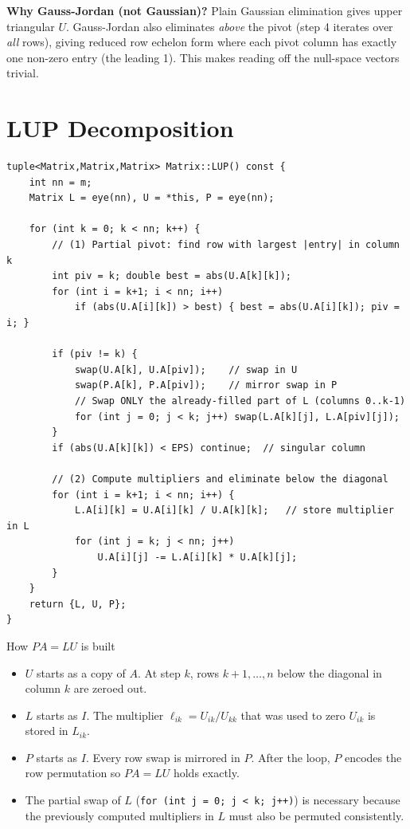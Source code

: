 \documentclass[12pt, a4paper]{article}
\newcommand{\code}[1]{\texttt{\small#1}}
\begin{document}
\noindent
\textbf{Why Gauss-Jordan (not Gaussian)?}  Plain Gaussian elimination gives
upper triangular $U$.  Gauss-Jordan also eliminates \emph{above} the pivot
(step 4 iterates over \emph{all} rows), giving reduced row echelon form where
each pivot column has exactly one non-zero entry (the leading 1).  This makes
reading off the null-space vectors trivial.

\section{LUP Decomposition}

\begin{lstlisting}
tuple<Matrix,Matrix,Matrix> Matrix::LUP() const {
    int nn = m;
    Matrix L = eye(nn), U = *this, P = eye(nn);

    for (int k = 0; k < nn; k++) {
        // (1) Partial pivot: find row with largest |entry| in column k
        int piv = k; double best = abs(U.A[k][k]);
        for (int i = k+1; i < nn; i++)
            if (abs(U.A[i][k]) > best) { best = abs(U.A[i][k]); piv = i; }

        if (piv != k) {
            swap(U.A[k], U.A[piv]);    // swap in U
            swap(P.A[k], P.A[piv]);    // mirror swap in P
            // Swap ONLY the already-filled part of L (columns 0..k-1)
            for (int j = 0; j < k; j++) swap(L.A[k][j], L.A[piv][j]);
        }
        if (abs(U.A[k][k]) < EPS) continue;  // singular column

        // (2) Compute multipliers and eliminate below the diagonal
        for (int i = k+1; i < nn; i++) {
            L.A[i][k] = U.A[i][k] / U.A[k][k];   // store multiplier in L
            for (int j = k; j < nn; j++)
                U.A[i][j] -= L.A[i][k] * U.A[k][j];
        }
    }
    return {L, U, P};
}
\end{lstlisting}

\begin{flowbox}{How $PA = LU$ is built}
\begin{itemize}[noitemsep]
  \item $U$ starts as a copy of $A$.  At step $k$, rows $k+1,\ldots,n$ below
        the diagonal in column $k$ are zeroed out.
  \item $L$ starts as $I$.  The multiplier $\ell_{ik} = U_{ik}/U_{kk}$ that
        was used to zero $U_{ik}$ is stored in $L_{ik}$.
  \item $P$ starts as $I$.  Every row swap is mirrored in $P$.  After the
        loop, $P$ encodes the row permutation so $PA = LU$ holds exactly.
  \item The partial swap of $L$ (\code{for (int j = 0; j < k; j++)}) is
        necessary because the previously computed multipliers in $L$ must
        also be permuted consistently.
\end{itemize}
\end{flowbox}
\end{document}
